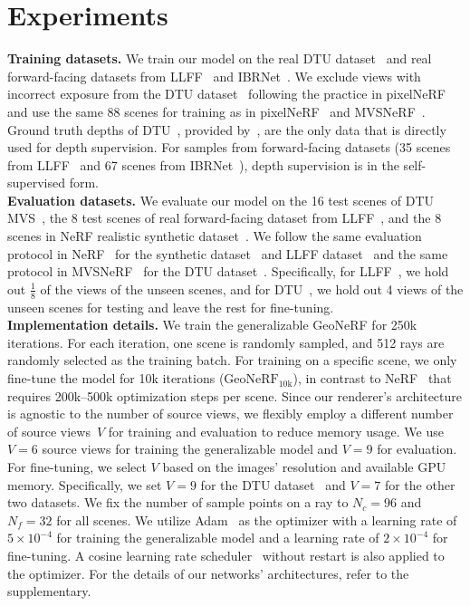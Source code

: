 \section{Experiments} \label{sec:c3_experiments}
\noindent\textbf{Training datasets.} We train our model on the real DTU dataset~\cite{jensen2014large} and real forward-facing datasets from LLFF~\cite{mildenhall2019llff} and IBRNet~\cite{wang2021ibrnet}. We exclude views with incorrect exposure from the DTU dataset~\cite{jensen2014large} following the practice in pixelNeRF~\cite{yu2021pixelnerf} and use the same 88 scenes for training as in pixelNeRF~\cite{yu2021pixelnerf} and MVSNeRF~\cite{chen2021mvsnerf}. Ground truth depths of DTU~\cite{jensen2014large}, provided by~\cite{yao2018mvsnet}, are the only data that is directly used for depth supervision. For samples from forward-facing datasets (35 scenes from LLFF~\cite{mildenhall2019llff} and 67 scenes from IBRNet~\cite{wang2021ibrnet}), depth supervision is in the self-supervised form. \\

\noindent\textbf{Evaluation datasets.} We evaluate our model on the 16 test scenes of DTU MVS~\cite{jensen2014large}, the 8 test scenes of real forward-facing dataset from LLFF~\cite{mildenhall2019llff}, and the 8 scenes in NeRF realistic synthetic dataset~\cite{mildenhall2020nerf}. We follow the same evaluation protocol in NeRF~\cite{mildenhall2020nerf} for the synthetic dataset~\cite{mildenhall2020nerf} and LLFF dataset~\cite{mildenhall2019llff} and the same protocol in MVSNeRF~\cite{chen2021mvsnerf} for the DTU dataset~\cite{jensen2014large}. Specifically, for LLFF~\cite{mildenhall2019llff}, we hold out $\frac{1}{8}$ of the views of the unseen scenes, and for DTU~\cite{jensen2014large}, we hold out 4 views of the unseen scenes for testing and leave the rest for fine-tuning.\\

\noindent\textbf{Implementation details.} We train the generalizable GeoNeRF for 250k iterations. For each iteration, one scene is randomly sampled, and 512 rays are randomly selected as the training batch. For training on a specific scene, we only fine-tune the model for 10k iterations ($\text{GeoNeRF}_{\text{10k}}$), in contrast to NeRF~\cite{mildenhall2020nerf} that requires 200k$\textrm{--}$500k optimization steps per scene. Since our renderer's architecture is agnostic to the number of source views, we flexibly employ a different number of source views~$V$ for training and evaluation to reduce memory usage. We use $V=6$ source views for training the generalizable model and $V=9$ for evaluation. For fine-tuning, we select $V$ based on the images' resolution and available GPU memory. Specifically, we set $V=9$ for the DTU dataset~\cite{jensen2014large} and $V=7$ for the other two datasets. We fix the number of sample points on a ray to $N_{c} = 96$ and $N_{f} = 32$ for all scenes. We utilize Adam~\cite{adam} as the optimizer with a learning rate of $5 \times 10^{-4}$ for training the generalizable model and a learning rate of $2 \times 10^{-4}$ for fine-tuning. A cosine learning rate scheduler~\cite{sgdr} without restart is also applied to the optimizer. For the details of our networks' architectures, refer to the supplementary.

